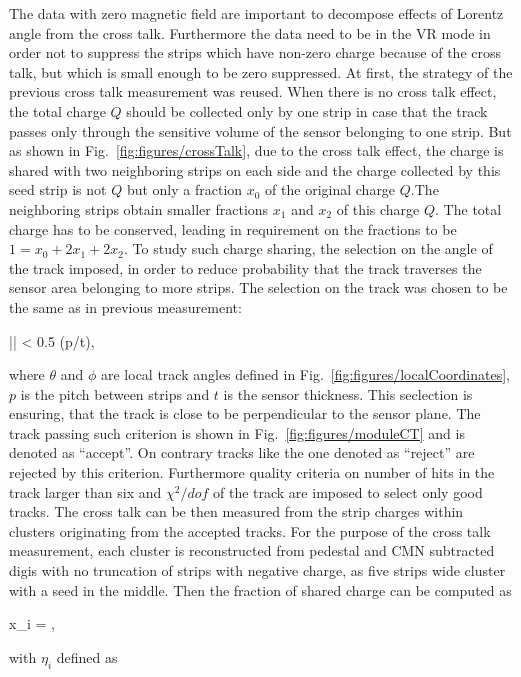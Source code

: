 The data with zero magnetic field are important to decompose effects of Lorentz angle from the cross talk. Furthermore the data need to be in the VR mode in order not to suppress the strips which have non-zero charge because of the cross talk, but which is small enough to be zero suppressed. At first, the strategy of the previous cross talk measurement was reused. When there is no cross talk effect, the total charge $Q$ should be collected only by one strip in case that the track passes only through the sensitive volume of the sensor belonging to one strip. But as shown in Fig.~\ref{fig:figures/crossTalk}, due to the cross talk effect, the charge is shared with two neighboring strips on each side and the charge collected by this seed strip is not $Q$ but only a fraction $x_{0}$ of the original charge $Q$.The neighboring strips obtain smaller fractions $x_{1}$ and $x_{2}$ of this charge $Q$. The total charge has to be conserved, leading in requirement on the fractions to be $1=x_{0}+2x_{1}+2x_{2}$. To study such charge sharing, the selection on the angle of the track imposed, in order to reduce probability that the track traverses the sensor area belonging to more strips. The selection on the track was chosen to be the same as in previous measurement:

{
|\theta {}\phi| < 0.5 \times (p/t),
}

where $\theta$ and $\phi$ are local track angles defined in Fig.~\ref{fig:figures/localCoordinates}, $p$ is the pitch between strips and $t$ is the sensor thickness. This seclection is ensuring, that the track is close to be perpendicular to the sensor plane. The track passing such criterion is shown in Fig.~\ref{fig:figures/moduleCT} and is denoted as ``accept''. On contrary tracks like the one denoted as ``reject'' are rejected by this criterion. Furthermore quality criteria on number of hits in the track larger than six and $\chi^{2}/dof$ of the track are imposed to select only good tracks. The cross talk can be then measured from the strip charges within clusters originating from the accepted tracks. For the purpose of the cross talk measurement, each cluster is reconstructed from pedestal and CMN subtracted digis with no truncation of strips with negative charge, as five strips wide cluster with a seed in the middle. Then the fraction of shared charge can be computed as


{
x_{i} =  ,
}

with $\eta_{i}$ defined as

